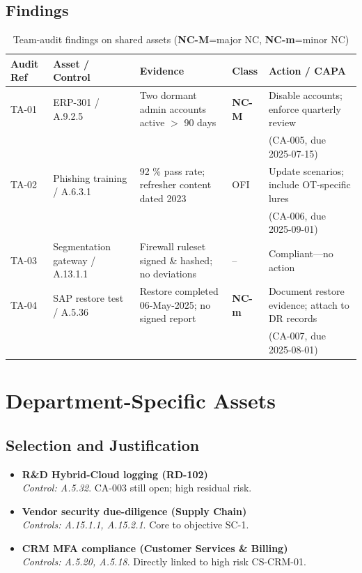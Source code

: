 \subsection{Findings}
\begin{table}[htbp]
  \centering
  \caption{Team-audit findings on shared assets (\textbf{NC-M}=major NC, \textbf{NC-m}=minor NC)}
  \label{tab:team_findings}
  \begin{tabular}{|p{2cm}|p{3.2cm}|p{3.5cm}|p{1.5cm}|p{3.5cm}|}
    \hline
    \textbf{Audit Ref} & \textbf{Asset / Control} & \textbf{Evidence} & \textbf{Class} & \textbf{Action / CAPA} \\
    \hline
    TA-01 & ERP-301 / A.9.2.5 & Two dormant admin accounts active $>$ 90 days & \textbf{NC-M} & Disable accounts; enforce quarterly review\\
          &                        &                               &            & (CA-005, due 2025-07-15) \\
    \hline
    TA-02 & Phishing training / A.6.3.1 & 92 \% pass rate; refresher content dated 2023 & OFI & Update scenarios; include \ac{OT}-specific lures\\
          &                                  &                                             &     & (CA-006, due 2025-09-01) \\
    \hline
    TA-03 & Segmentation gateway / A.13.1.1 & Firewall ruleset signed \& hashed; no deviations & -- & Compliant---no action \\
    \hline
    TA-04 & SAP restore test / A.5.36 & Restore completed 06-May-2025; no signed report & \textbf{NC-m} & Document restore evidence; attach to DR records\\
          &                            &                                            &           & (CA-007, due 2025-08-01) \\
    \hline
  \end{tabular}
\end{table}

\section{Department-Specific Assets}
\subsection{Selection and Justification}
\begin{itemize}
  \item \textbf{R\&D Hybrid-Cloud logging (RD-102)}\\
        \emph{Control: A.5.32}. CA-003 still open; high residual risk.
  \item \textbf{Vendor security due-diligence (Supply Chain)}\\
        \emph{Controls: A.15.1.1, A.15.2.1}. Core to objective SC-1.
  \item \textbf{CRM MFA compliance (Customer Services \& Billing)}\\
        \emph{Controls: A.5.20, A.5.18}. Directly linked to high risk CS-CRM-01.
\end{itemize}


